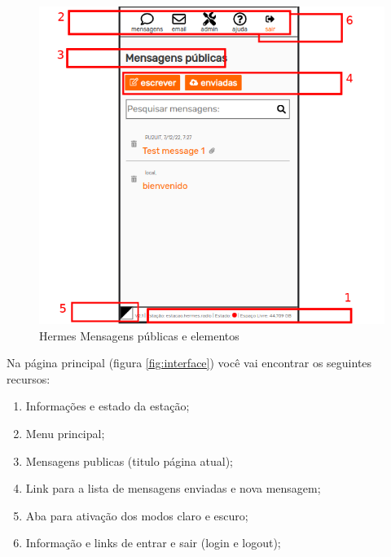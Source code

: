 \documentclass[11pt,a4paper]{article}
\begin{document}
    \begin{figure}[H]
    \centering
    \includegraphics[width=1\columnwidth]{screenshots/frontend/pt_kn/messagesindex_pt.png}
    \caption{Hermes Mensagens públicas e elementos}
    \label{fig:messagesindex}
    \end{figure}
    
Na página principal (figura \ref{fig:interface}) você vai encontrar os seguintes recursos:

\begin{enumerate}
    \item Informações e estado da estação;
    \item Menu principal;
    \item Mensagens publicas (titulo página atual);
    \item Link para a lista de mensagens enviadas e nova mensagem;
    \item Aba para ativação dos modos claro e escuro;
    \item Informação e links de entrar e sair (login e logout);
\end{enumerate}
\end{document}
